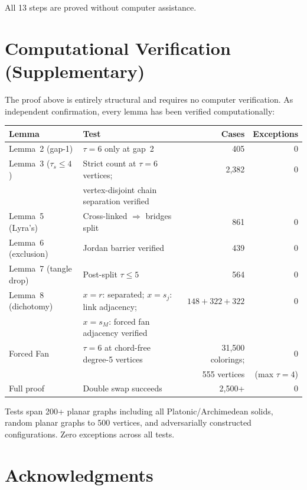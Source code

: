 \documentclass[11pt]{article}
\theoremstyle{remark}
\begin{document}
All 13 steps are proved without computer assistance.

\section{Computational Verification (Supplementary)}

The proof above is entirely structural and requires no computer verification. As independent confirmation, every lemma has been verified computationally:

\begin{center}
\begin{tabular}{l l r r}
\hline
\textbf{Lemma} & \textbf{Test} & \textbf{Cases} & \textbf{Exceptions} \\
\hline
Lemma~2 (gap-1) & $\tau = 6$ only at gap~2 & 405 & 0 \\
Lemma~3 ($\tau_s \leq 4$) & Strict count at $\tau = 6$ vertices; & 2,382 & 0 \\
 & vertex-disjoint chain separation verified & & \\
Lemma~5 (Lyra's) & Cross-linked $\Rightarrow$ bridges split & 861 & 0 \\
Lemma~6 (exclusion) & Jordan barrier verified & 439 & 0 \\
Lemma~7 (tangle drop) & Post-split $\tau \leq 5$ & 564 & 0 \\
Lemma~8 (dichotomy) & $x = r$: separated; $x = s_j$: link adjacency; & $148 + 322 + 322$ & 0 \\
 & $x = s_M$: forced fan adjacency verified & & \\
Forced Fan & $\tau = 6$ at chord-free degree-5 vertices & 31,500 colorings; & 0 \\
 & & 555 vertices & (max $\tau = 4$) \\
Full proof & Double swap succeeds & 2,500+ & 0 \\
\hline
\end{tabular}
\end{center}

Tests span 200+ planar graphs including all Platonic/Archimedean solids, random planar graphs to 500 vertices, and adversarially constructed configurations. Zero exceptions across all tests.

\section*{Acknowledgments}
\end{document}
